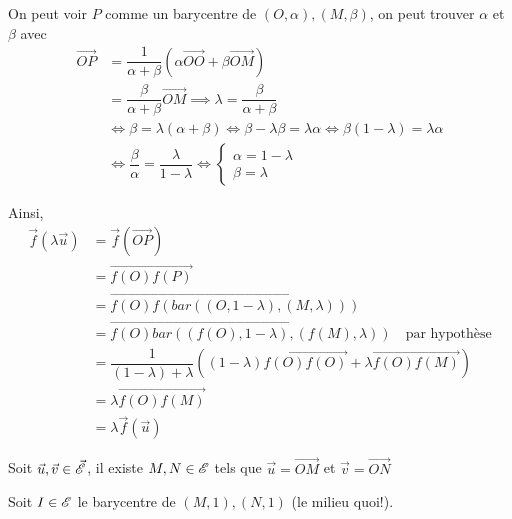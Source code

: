 \documentclass[a4paper,12pt]{article}
\begin{document}
\begin{demonstration}
\begin{description}
\begin{description}
            On peut voir $P$ comme un barycentre de $(O, \alpha), (M, \beta)$, on peut trouver $\alpha$ et $\beta$ avec
            \begin{align*}
                \overrightarrow{OP} &= \dfrac{1}{\alpha + \beta} (\alpha \overrightarrow{OO} + \beta \overrightarrow{OM}) \\
                &= \dfrac{\beta}{\alpha + \beta} \overrightarrow{OM} \implies \lambda = \dfrac{\beta}{\alpha + \beta} \\
                &\iff \beta = \lambda (\alpha + \beta) \iff \beta - \lambda \beta = \lambda \alpha \iff \beta (1 - \lambda) = \lambda \alpha \\
                &\iff \dfrac{\beta}{\alpha} = \dfrac{\lambda}{1 - \lambda} \iff \begin{cases}
                    \alpha = 1 - \lambda \\
                    \beta = \lambda
                \end{cases}
            \end{align*}

            Ainsi,
            \begin{align*}
                \vec{f}(\lambda \vec{u}) &= \vec{f}(\overrightarrow{OP}) \\
                &= \overrightarrow{f(O) f(P)} \\
                &= \overrightarrow{f(O) f(bar((O, 1 - \lambda), (M, \lambda)))} \\
                &= \overrightarrow{f(O) bar((f(O), 1 - \lambda), (f(M), \lambda))} \quad \text{par hypothèse} \\
                &= \dfrac{1}{(1 - \lambda) + \lambda} ((1 - \lambda) \overrightarrow{f(O) f(O)} + \lambda \overrightarrow{f(O) f(M)}) \\
                &= \lambda \overrightarrow{f(O) f(M)} \\
                &= \lambda \vec{f}(\vec{u})
            \end{align*}

            \item[Linéarité.] %
            Soit $\vec{u}, \vec{v} \in \vec{\mathscr{E}}$, il existe $M, N \in \mathscr{E}$ tels que $\vec{u} = \overrightarrow{OM}$ et $\vec{v} = \overrightarrow{ON}$

            Soit $I \in \mathscr{E}$ le barycentre de $(M, 1), (N, 1)$ (le milieu quoi!).


\end{description}
\end{description}
\end{demonstration}
\end{document}
